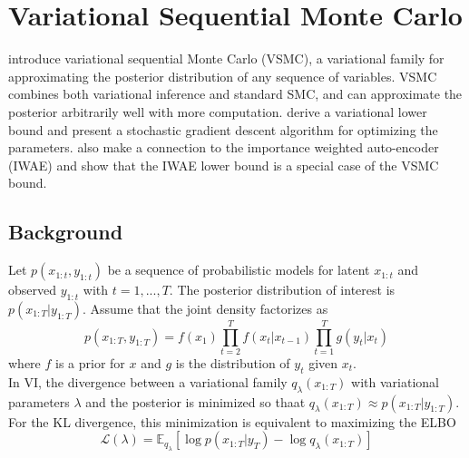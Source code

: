 \documentclass{article}
\begin{document}
\section{Variational Sequential Monte Carlo}

\textcite{Naesseth:2018} introduce variational sequential Monte Carlo (VSMC), a variational family for approximating the posterior distribution of any sequence of variables. VSMC combines both variational inference and standard SMC, and can approximate the posterior arbitrarily well with more computation. \textcite{Naesseth:2018} derive a variational lower bound and present a stochastic gradient descent algorithm for optimizing the parameters. \textcite{Naesseth:2018} also make a connection to the importance weighted auto-encoder (IWAE) and show that the IWAE lower bound is a special case of the VSMC bound.

\subsection{Background}

Let $p(x_{1:t},y_{1:t})$ be a sequence of probabilistic models for latent $x_{1:t}$ and observed $y_{1:t}$ with $t=1,...,T$. The posterior distribution of interest is $p(x_{1:T}|y_{1:T})$. Assume that the joint density factorizes as
\[
p(x_{1:T},y_{1:T}) = f(x_1)\prod_{t=2}^Tf(x_t|x_{t-1})\prod_{t=1}^Tg(y_t|x_t)
\]
where $f$ is a prior for $x$ and $g$ is the distribution of $y_t$ given $x_t$.
\\

In VI, the divergence between a variational family $q_\lambda(x_{1:T})$ with variational parameters $\lambda$ and the posterior is minimized so thaat $q_\lambda(x_{1:T})\approx p(x_{1:T}|y_{1:T})$. For the KL divergence, this minimization is equivalent to maximizing the ELBO
\[
\mathcal{L}(\lambda) = \mathbb{E}_{q_\lambda}[\log p(x_{1:T}|y_{T})-\log q_\lambda(x_{1:T})]
\]
\end{document}
